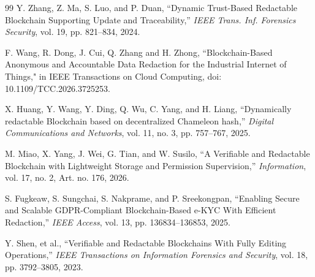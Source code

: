 \documentclass[lettersize,journal]{IEEEtran}
\begin{document}
\begin{thebibliography}{99}
Y. Zhang, Z. Ma, S. Luo, and P. Duan,
``Dynamic Trust-Based Redactable Blockchain Supporting Update and Traceability,''
\textit{IEEE Trans. Inf. Forensics Security}, vol. 19, pp. 821--834, 2024.

F. Wang, R. Dong, J. Cui, Q. Zhang and H. Zhong, ``Blockchain-Based Anonymous and Accountable Data Redaction for the Industrial Internet of Things," in IEEE Transactions on Cloud Computing, doi: 10.1109/TCC.2026.3725253.

X. Huang, Y. Wang, Y. Ding, Q. Wu, C. Yang, and H. Liang,
``Dynamically redactable Blockchain based on decentralized Chameleon hash,''
\textit{Digital Communications and Networks}, vol. 11, no. 3, pp. 757--767, 2025.

M. Miao, X. Yang, J. Wei, G. Tian, and W. Susilo,
``A Verifiable and Redactable Blockchain with Lightweight Storage and Permission Supervision,''
\textit{Information}, vol. 17, no. 2, Art. no. 176, 2026.

S. Fugkeaw, S. Sungchai, S. Nakprame, and P. Sreekongpan,
``Enabling Secure and Scalable GDPR-Compliant Blockchain-Based e-KYC With Efficient Redaction,''
\textit{IEEE Access}, vol. 13, pp. 136834--136853, 2025.

Y. Shen, et al.,
``Verifiable and Redactable Blockchains With Fully Editing Operations,''
\textit{IEEE Transactions on Information Forensics and Security}, vol. 18, pp. 3792--3805, 2023.

\end{thebibliography}
\end{document}
